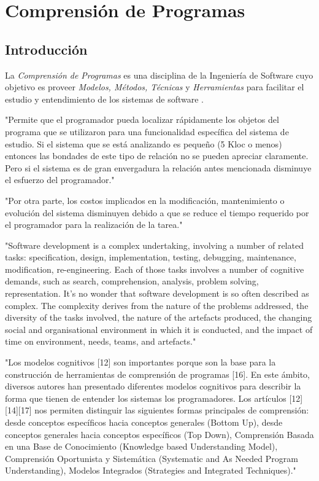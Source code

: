 \chapter{Comprensión de Programas}

\section{Introducción}

La \textit{Comprensión de Programas} es una disciplina de la Ingeniería de Software
cuyo objetivo es proveer \textit{Modelos, Métodos, Técnicas} y \textit{Herramientas}
para facilitar el estudio y entendimiento de los sistemas de software \cite{BeronHenriquesPereira10}.

"Permite que el programador pueda localizar rápidamente los objetos del programa que se
utilizaron para una funcionalidad específica del sistema de estudio.
Si el sistema que se está analizando es pequeño (5 Kloc o menos) entonces las bondades 
de este tipo de relación no se pueden apreciar claramente.
Pero si el sistema es de gran envergadura la relación antes mencionada disminuye el
esfuerzo del programador."\cite{BeronHenriquesPereira10}

"Por otra parte, los costos implicados en la modificación, mantenimiento o evolución
del sistema disminuyen debido a que se reduce el tiempo requerido por el programador
para la realización de la tarea."\cite{BeronHenriquesPereira10}

"Software development is a complex undertaking, involving a number of related tasks: specification,
design, implementation, testing, debugging, maintenance, modification, re-engineering. Each of those
tasks involves a number of cognitive demands, such as search, comprehension, analysis, problem
solving, representation. It’s no wonder that software development is so often described as complex.
The complexity derives from the nature of the problems addressed, the diversity of the tasks involved,
the nature of the artefacts produced, the changing social and organisational environment in which it is
conducted, and the impact of time on environment, needs, teams, and artefacts."\cite{PetreDeQuincey06}

"Los modelos cognitivos [12] son importantes porque son la base para la construcción de herramientas
de comprensión de programas [16].
En este ámbito, diversos autores han presentado diferentes modelos cognitivos para describir
la forma que tienen de entender los sistemas los programadores.
Los artículos [12][14][17] nos permiten distinguir las siguientes formas principales de comprensión:
desde conceptos específicos hacia conceptos generales (Bottom Up), desde conceptos generales
hacia conceptos específicos (Top Down), Comprensión Basada en una Base de Conocimiento (Knowledge
based Understanding Model), Comprensión Oportunista y Sistemática (Systematic and As Needed Program
Understanding), Modelos Integrados (Strategies and Integrated Techniques)."
\cite{BeronHenriquesPereiraUzal07}


